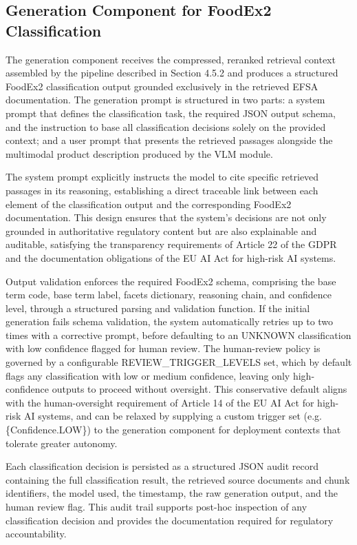 \hypertarget{generation-component-for-foodex2-classification}{%
\subsection{Generation Component for FoodEx2 Classification}\label{generation-component-for-foodex2-classification}}

The generation component receives the compressed, reranked retrieval context assembled by the pipeline described in Section 4.5.2 and produces a structured FoodEx2 classification output grounded exclusively in the retrieved EFSA documentation. The generation prompt is structured in two parts: a system prompt that defines the classification task, the required JSON output schema, and the instruction to base all classification decisions solely on the provided context; and a user prompt that presents the retrieved passages alongside the multimodal product description produced by the VLM module.

The system prompt explicitly instructs the model to cite specific retrieved passages in its reasoning, establishing a direct traceable link between each element of the classification output and the corresponding FoodEx2 documentation. This design ensures that the system's decisions are not only grounded in authoritative regulatory content but are also explainable and auditable, satisfying the transparency requirements of Article 22 of the GDPR and the documentation obligations of the EU AI Act for high-risk AI systems.

Output validation enforces the required FoodEx2 schema, comprising the base term code, base term label, facets dictionary, reasoning chain, and confidence level, through a structured parsing and validation function. If the initial generation fails schema validation, the system automatically retries up to two times with a corrective prompt, before defaulting to an UNKNOWN classification with low confidence flagged for human review. The human-review policy is governed by a configurable REVIEW\_TRIGGER\_LEVELS set, which by default flags any classification with low or medium confidence, leaving only high-confidence outputs to proceed without oversight. This conservative default aligns with the human-oversight requirement of Article 14 of the EU AI Act for high-risk AI systems, and can be relaxed by supplying a custom trigger set (e.g. \{Confidence.LOW\}) to the generation component for deployment contexts that tolerate greater autonomy.

Each classification decision is persisted as a structured JSON audit record containing the full classification result, the retrieved source documents and chunk identifiers, the model used, the timestamp, the raw generation output, and the human review flag. This audit trail supports post-hoc inspection of any classification decision and provides the documentation required for regulatory accountability.

